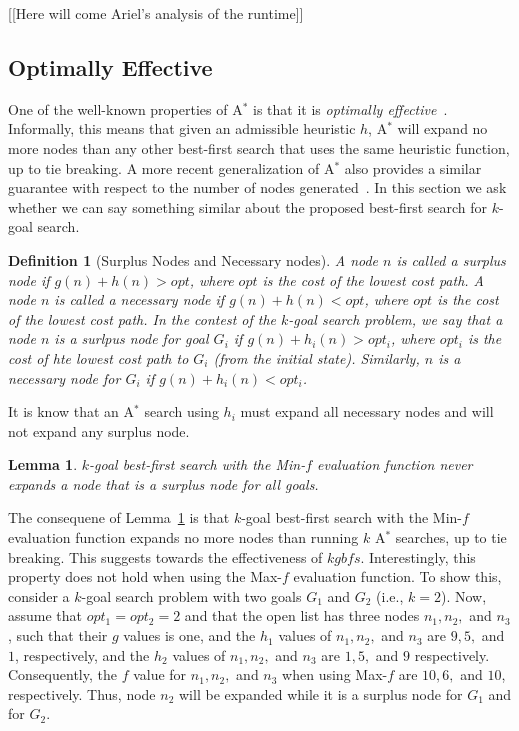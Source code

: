 \documentclass{aicom2e}
\newtheorem{definition}{Definition}
\newtheorem{lemma}{Lemma}
\newcommand{\kgs}{$k$-goal search}
\newcommand{\kgbfs}{$k$-goal best-first search}
\newcommand{\astar}{A$^*$}
\begin{document}
[[Here will come Ariel's analysis of the runtime]]

\subsection{Optimally Effective}
One of the well-known properties of \astar{} is that it is {\em optimally effective}~\cite{dechter}. Informally, this means that given an admissible heuristic $h$, \astar{} will expand no more nodes than any other best-first search
that uses the same heuristic function, up to tie breaking. 
A more recent generalization of \astar{} also provides a similar guarantee
with respect to the number of nodes generated~\cite{Goldenberg}. 
In this section we ask whether we can say something similar about the proposed
best-first search for \kgs{}. 

\begin{definition}[Surplus Nodes and Necessary nodes]
A node $n$ is called a surplus node if $g(n)+h(n)>opt$, where $opt$ is the cost of the lowest cost path. 
A node $n$ is called a necessary node if $g(n)+h(n)<opt$, where $opt$ is the cost of the lowest cost path. 
In the contest of the \kgs{} problem, we say that a node $n$ is a surlpus node for goal $G_i$ if $g(n)+h_i(n)>opt_i$, where $opt_i$ is the cost of hte lowest cost path to $G_i$ (from the initial state). Similarly, $n$ is a necessary node for $G_i$
if $g(n)+h_i(n)<opt_i$. 
\end{definition}
It is know that an \astar{} search using $h_i$ 
must expand all necessary nodes and will not expand any surplus node. 


\begin{lemma}
\kgbfs{} with the Min-$f$ evaluation function never expands a node
that is a surplus node for all goals. 
\label{lem:min-f-no-surplus}
\end{lemma}
The consequene of Lemma~\ref{lem:min-f-no-surplus} is 
that \kgbfs{} with the Min-$f$ evaluation function expands no more nodes
than running $k$ \astar{} searches, up to tie breaking. This suggests towards the 
effectiveness of $kgbfs{}$. Interestingly, this property does not hold when using
the Max-$f$ evaluation function. To show this, consider a \kgs{} problem with two goals 
$G_1$ and $G_2$ (i.e., $k=2$). Now, assume that $opt_1=opt_2=2$
and that the open list has three nodes $n_1, n_2,$ and $n_3$, such that
their $g$ values is one, and the $h_1$ values of $n_1, n_2,$ and $n_3$
are $9,5,$ and $1$, respectively, and the $h_2$ values of $n_1, n_2,$ and $n_3$ 
are $1,5,$ and $9$ respectively. Consequently, the $f$ value for $n_1, n_2,$ and $n_3$
when using Max-$f$ are $10,6,$ and $10$, respectively. Thus, node $n_2$ will be expanded
while it is a surplus node for $G_1$ and for $G_2$. 
\end{document}
